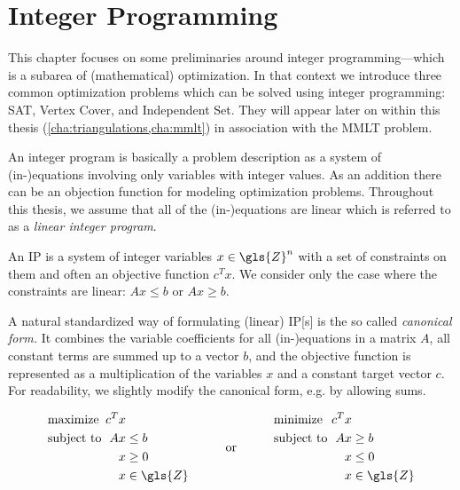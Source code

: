 \chapter{Integer Programming}
This chapter focuses on some preliminaries around integer
programming---which is a subarea of (mathematical) optimization.
In that context we introduce three common optimization problems which
can be solved using integer programming: SAT, Vertex Cover, and
Independent Set. They will appear later on within this thesis
(\cref{cha:triangulations,cha:mmlt}) in association with the
\gls{MMLT} problem.

An integer program is basically a problem description as a system
of (in-)equations involving only variables with integer values. As
an addition there can be an objection function for modeling
optimization problems. Throughout this thesis, we assume that all
of the (in-)equations are linear which is referred to as a
\emph{linear integer program}.

\begin{definition}
  An \gls{IP} is a system of integer variables
  \(x \in \gls{Z}^n\) with a set of constraints on them and often an 
  objective function \(c^T x\). We consider only the case where the 
  constraints are linear: \(Ax \leq b\) or \(Ax \geq b\).
\end{definition}

A natural standardized way of formulating (linear) \gls{IP}[s] is the 
so called \emph{canonical form.} It combines the variable coefficients
for all (in-)equations in a matrix \(A\), all constant terms are
summed up to a vector \(b\), and the objective function is represented
as a multiplication of the variables \(x\) and a constant target
vector \(c\). For readability, we slightly modify the canonical form,
e.g. by allowing sums.

\begin{problem}
  \[
  \begin{array}{lll}
    \begin{alignedat}{2}
      &\text{maximize } & c^Tx \\
      &\text{subject to } & Ax &\leq b \\
      && x &\geq 0 \\
      && x &\in \gls{Z}
    \end{alignedat}
    & \text{\hspace{2em}or\hspace{2em}} &
    \begin{alignedat}{2}
      &\text{minimize } & c^Tx \\
      &\text{subject to } & Ax &\geq b \\
      && x &\leq 0 \\
      && x &\in \gls{Z}
    \end{alignedat}
  \end{array}
  \]
\end{problem}

